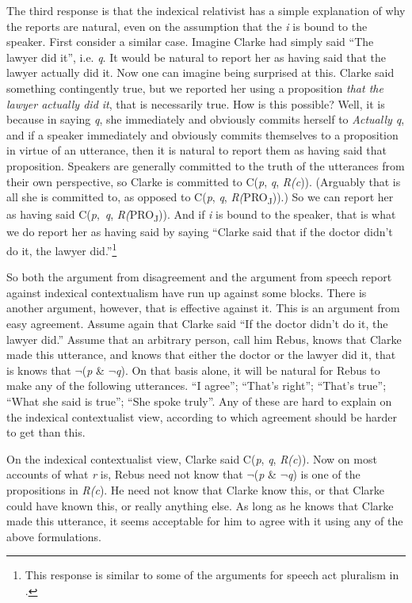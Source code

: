The third response is that the indexical relativist has a simple explanation of why the reports are natural, even on the assumption that the \textit{i} is bound to the speaker. First consider a similar case. Imagine Clarke had simply said ``The lawyer did it'', i.e. \textit{q}. It would be natural to report her as having said that the lawyer actually did it. Now one can imagine being surprised at this. Clarke said something contingently true, but we reported her using a proposition \textit{that the lawyer actually did it}, that is necessarily true. How is this possible? Well, it is because in saying \textit{q}, she immediately and obviously commits herself to \textit{Actually q}, and if a speaker immediately and obviously commits themselves to a proposition in virtue of an utterance, then it is natural to report them as having said that proposition. Speakers are generally committed to the truth of the utterances from their own perspective, so Clarke is committed to C(\textit{p}, \textit{q}, \textit{R(c})). (Arguably that is all she is committed to, as opposed to C(\textit{p}, \textit{q}, \textit{R(}PRO\textsubscript{J})).) So we can report her as having said C(\textit{p},~\textit{q}, \textit{R(}PRO\textsubscript{J})). And if \textit{i} is bound to the speaker, that is what we do report her as having said by saying ``Clarke said that if the doctor didn't do it, the lawyer did.''\footnote{ This response is similar to some of the arguments for speech act pluralism in \citet{Cappelen2005}.}

So both the argument from disagreement and the argument from speech report against indexical contextualism have run up against some blocks. There is another argument, however, that is effective against it. This is an argument from easy agreement. Assume again that Clarke said ``If the doctor didn't do it, the lawyer did.'' Assume that an arbitrary person, call him Rebus, knows that Clarke made this utterance, and knows that either the doctor or the lawyer did it, that is knows that \(\neg\){}(\textit{p} \& \(\neg\){}\textit{q}). On that basis alone, it will be natural for Rebus to make any of the following utterances. ``I agree''; ``That's right''; ``That's true''; ``What she said is true''; ``She spoke truly''. Any of these are hard to explain on the indexical contextualist view, according to which agreement should be harder to get than this.

On the indexical contextualist view, Clarke said C(\textit{p}, \textit{q}, \textit{R(c})). Now on most accounts of what \textit{r} is, Rebus need not know that \(\neg\){}(\textit{p} \& \(\neg\){}\textit{q}) is one of the propositions in \textit{R(c}). He need not know that Clarke know this, or that Clarke could have known this, or really anything else. As long as he knows that Clarke made this utterance, it seems acceptable for him to agree with it using any of the above formulations.

